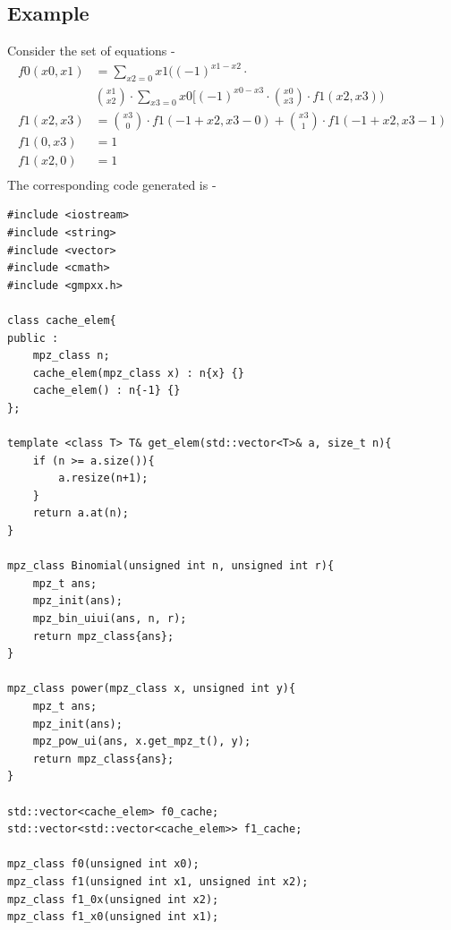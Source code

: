 \documentclass[12pt]{report}
\begin{document}
    \subsection*{Example}
    Consider the set of equations - 
    \begin{align*}
        f0(x0,x1)&=\sum_{x2=0}{x1}((-1)^{x1-x2}\cdot\\ & \binom{x1}{x2}\cdot \sum_{x3=0}{x0}[(-1)^{x0-x3}\cdot \binom{x0}{x3}\cdot f1(x2,x3))\\
        f1(x2,x3)&=\binom{x3}{0}\cdot f1(-1+x2,x3-0)+\binom{x3}{1}\cdot f1(-1+x2,x3-1)\\
        f1(0,x3)&=1\\
        f1(x2,0)&=1\\
    \end{align*}
    The corresponding code generated is - 
    \begin{verbatim}
#include <iostream>
#include <string>
#include <vector>
#include <cmath>
#include <gmpxx.h>

class cache_elem{
public : 
	mpz_class n;
	cache_elem(mpz_class x) : n{x} {}
	cache_elem() : n{-1} {}
};

template <class T> T& get_elem(std::vector<T>& a, size_t n){
	if (n >= a.size()){
		a.resize(n+1);
	}
	return a.at(n);
}

mpz_class Binomial(unsigned int n, unsigned int r){
	mpz_t ans;
	mpz_init(ans);
	mpz_bin_uiui(ans, n, r);
	return mpz_class{ans};
}

mpz_class power(mpz_class x, unsigned int y){
	mpz_t ans;
	mpz_init(ans);
	mpz_pow_ui(ans, x.get_mpz_t(), y);
	return mpz_class{ans};
}

std::vector<cache_elem> f0_cache;
std::vector<std::vector<cache_elem>> f1_cache;

mpz_class f0(unsigned int x0);
mpz_class f1(unsigned int x1, unsigned int x2);
mpz_class f1_0x(unsigned int x2);
mpz_class f1_x0(unsigned int x1);


\end{verbatim}
\end{document}
